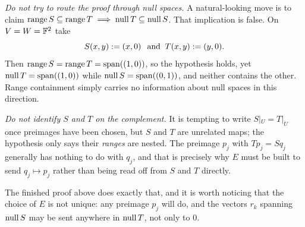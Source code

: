 \begin{xrcs}
\begin{xprf}
\begin{ainote}
      \emph{Do not try to route the proof through null spaces.} A natural-looking move is to claim $\operatorname{range} S \subseteq \operatorname{range} T \implies \operatorname{null} T \subseteq \operatorname{null} S$. That implication is false. On $V = W = \mathbb{F}^2$ take
      \begin{equation}
        S(x,y) := (x,0) \;\;\, \text{and}\;\; T(x,y) := (y,0).
      \end{equation}
      Then $\operatorname{range} S = \operatorname{range} T = \operatorname{span} ((1,0))$, so the hypothesis holds, yet $\operatorname{null} T = \operatorname{span} ((1,0))$ while $\operatorname{null} S = \operatorname{span} ((0,1))$, and neither contains the other. Range containment simply carries no information about null spaces in this direction.

      \emph{Do not identify $S$ and $T$ on the complement.} It is tempting to write $S|_U = T|_U$ once preimages have been chosen, but $S$ and $T$ are unrelated maps; the hypothesis only says their \emph{ranges} are nested. The preimage $p_j$ with $T p_j = S q_j$ generally has nothing to do with $q_j$, and that is precisely why $E$ must be built to send $q_j \mapsto p_j$ rather than being read off from $S$ and $T$ directly.

      The finished proof above does exactly that, and it is worth noticing that the choice of $E$ is not unique: any preimage $p_j$ will do, and the vectors $r_k$ spanning $\operatorname{null} S$ may be sent anywhere in $\operatorname{null} T$, not only to $0$.
    \end{ainote}
  \end{xprf}
\end{xrcs}

